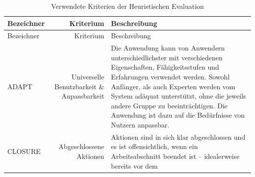 \documentclass[
  12pt,
  ngerman,
  a4paper,
]{article}
\begin{document}
\begin{longtable}[]{@{}lrl@{}}
\caption{Verwendete Kriterien der Heuristischen Evaluation
\label{tbl:criteria}}\tabularnewline
\toprule
\begin{minipage}[b]{0.09\columnwidth}\raggedright
Bezeichner\strut
\end{minipage} & \begin{minipage}[b]{0.25\columnwidth}\raggedleft
Kriterium\strut
\end{minipage} & \begin{minipage}[b]{0.58\columnwidth}\raggedright
Beschreibung\strut
\end{minipage}\tabularnewline
\midrule
\endfirsthead
\toprule
\begin{minipage}[b]{0.09\columnwidth}\raggedright
Bezeichner\strut
\end{minipage} & \begin{minipage}[b]{0.25\columnwidth}\raggedleft
Kriterium\strut
\end{minipage} & \begin{minipage}[b]{0.58\columnwidth}\raggedright
Beschreibung\strut
\end{minipage}\tabularnewline
\midrule
\endhead
\begin{minipage}[t]{0.09\columnwidth}\raggedright
ADAPT\strut
\end{minipage} & \begin{minipage}[t]{0.25\columnwidth}\raggedleft
Universelle Benutzbarkeit \& Anpassbarkeit\strut
\end{minipage} & \begin{minipage}[t]{0.58\columnwidth}\raggedright
Die Anwendung kann von Anwendern unterschiedlichster mit verschiedenen
Eigenschaften, Fähigkeitsstufen und Erfahrungen verwendet werden. Sowohl
Anfänger, als auch Experten werden vom System adäquat unterstützt, ohne
die jeweils andere Gruppe zu beeinträchtigen. Die Anwendung ist dazu auf
die Bedürfnisse von Nutzern anpassbar.\strut
\end{minipage}\tabularnewline
\begin{minipage}[t]{0.09\columnwidth}\raggedright
CLOSURE\strut
\end{minipage} & \begin{minipage}[t]{0.25\columnwidth}\raggedleft
Abgeschlossene Aktionen\strut
\end{minipage} & \begin{minipage}[t]{0.58\columnwidth}\raggedright
Aktionen sind in sich klar abgeschlossen und es ist offensichtlich, wenn
ein Arbeitsabschnitt beendet ist -- idealerweise bereits vor dem

\end{minipage}
\end{longtable}
\end{document}
